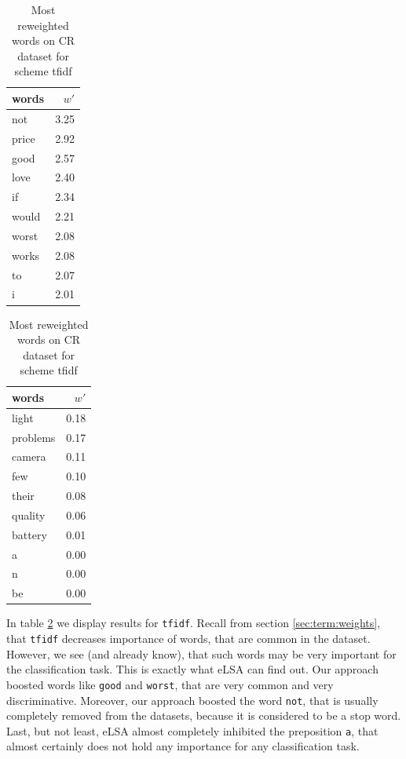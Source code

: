     
\begin{table}[h]
    \centering
    \begin{minipage}{.4\linewidth}
      \centering
        \begin{tabular}{lr}
\toprule
 words &  $w'$ \\
\midrule
   not &  3.25 \\
 price &  2.92 \\
  good &  2.57 \\
  love &  2.40 \\
    if &  2.34 \\
 would &  2.21 \\
 worst &  2.08 \\
 works &  2.08 \\
    to &  2.07 \\
     i &  2.01 \\
\bottomrule
\end{tabular}

    \end{minipage}
    \begin{minipage}{.4\linewidth}
      \centering
        \begin{tabular}{lr}
\toprule
    words &  $w'$ \\
\midrule
    light &  0.18 \\
 problems &  0.17 \\
   camera &  0.11 \\
      few &  0.10 \\
    their &  0.08 \\
  quality &  0.06 \\
  battery &  0.01 \\
        a &  0.00 \\
        n &  0.00 \\
       be &  0.00 \\
\bottomrule
\end{tabular}
    \end{minipage} 
    \caption{Most reweighted words on CR dataset for scheme tfidf}
    \label{tab:words:CR:tfidf}
\end{table}

    In table \ref{tab:words:CR:tfidf} we display results for \texttt{tfidf}. 
    Recall from section \ref{sec:term:weights}, that \texttt{tfidf} decreases importance of words, that are common in the dataset.
    However, we see (and already know), that such words may be very important for the classification task.
    This is exactly what eLSA can find out. 
    Our approach boosted words like \texttt{good} and \texttt{worst}, that are very common and very discriminative.
    Moreover, our approach boosted the word \texttt{not}, that is usually completely removed from the datasets, because it is considered to be a stop word. 
    Last, but not least, eLSA almost completely inhibited the preposition \texttt{a}, that almost certainly does not hold any importance for any classification task.


